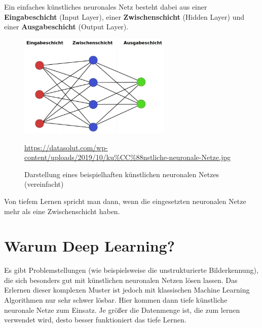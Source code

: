 \newpage

Ein einfaches künstliches neuronales Netz besteht dabei aus einer \textbf{Eingabeschicht} (Input Layer), einer \textbf{Zwischenschicht} (Hidden Layer) und einer \textbf{Ausgabeschicht} (Output Layer). \cite{datasolut2}

\begin{figure}[H]
	\centering
	\includegraphics[width=0.65\textwidth]{kapitel3/images/Simples_Neuronales_Netz.jpg}
	\caption{Darstellung eines beispielhaften künstlichen neuronalen Netzes \\ (vereinfacht)}
	\label{fig:simples-neuronales-netz}
	\vspace{0.2cm}
	\quelle\url{https://datasolut.com/wp-content/uploads/2019/10/ku%CC%88nstliche-neuronale-Netze.jpg}
\end{figure}

Von tiefem Lernen spricht man dann, wenn die eingesetzten neuronalen Netze mehr als eine Zwischenschicht haben.  \cite{datasolut2} 

\section{Warum Deep Learning?}

Es gibt Problemstellungen (wie beispielsweise die unstrukturierte Bilderkennung), die sich besonders gut mit künstlichen neuronalen Netzen lösen lassen. Das Erlernen dieser komplexen Muster ist jedoch mit klassischen Machine Learning Algorithmen nur sehr schwer lösbar. Hier kommen dann tiefe künstliche neuronale Netze zum Einsatz. Je größer die Datenmenge ist, die zum lernen verwendet wird, desto besser funktioniert das tiefe Lernen. \cite{datasolut2}


